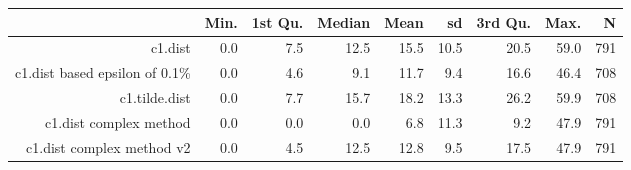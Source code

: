 \begin{table}[ht]
\centering
\begin{tabular}{rrrrrrrrr}
  \hline
 & Min. & 1st Qu. & Median & Mean & sd & 3rd Qu. & Max. & N \\ 
  \hline
c1.dist & 0.0 & 7.5 & 12.5 & 15.5 & 10.5 & 20.5 & 59.0 & 791 \\ 
  c1.dist based epsilon of 0.1\% & 0.0 & 4.6 & 9.1 & 11.7 & 9.4 & 16.6 & 46.4 & 708 \\ 
  c1.tilde.dist & 0.0 & 7.7 & 15.7 & 18.2 & 13.3 & 26.2 & 59.9 & 708 \\ 
  c1.dist complex method & 0.0 & 0.0 & 0.0 & 6.8 & 11.3 & 9.2 & 47.9 & 791 \\ 
  c1.dist complex method v2 & 0.0 & 4.5 & 12.5 & 12.8 & 9.5 & 17.5 & 47.9 & 791 \\ 
   \hline
\end{tabular}
\end{table}
